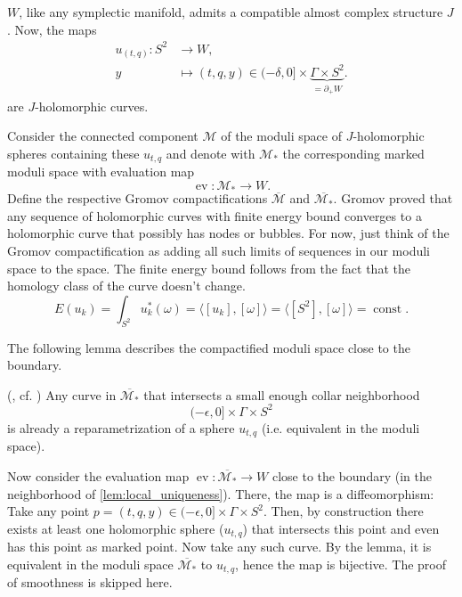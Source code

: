 
$W$, like any symplectic manifold, admits a compatible almost complex structure $J$.
Now, the maps
\begin{align*}
    u_{(t,q)} \colon S^2 &\to W,\\
    y &\mapsto (t, q, y) \in (-\delta, 0] \times \underbrace{\Gamma \times S^2}_{= \partial_+ W}.
\end{align*}
are $J$-holomorphic curves.

Consider the connected component $\mathcal{M}$ of the moduli space of $J$-holomorphic spheres containing these $u_{t,q}$
and denote with $\mathcal{M}_*$ the corresponding marked moduli space with evaluation map
\[
    \operatorname{ev}\colon \mathcal{M}_* \to W.
\]
Define the respective Gromov compactifications $\overline{\mathcal{M}}$ and $\overline{\mathcal{M}_*}$.
Gromov proved that any sequence of holomorphic curves with finite energy bound converges to a
holomorphic curve that possibly has nodes or bubbles.
For now, just think of the Gromov compactification as adding all such limits of sequences in our moduli space to the space.
The finite energy bound follows from the fact that the homology class of the curve doesn't change.
\[
    E(u_k) = \int_{S^2} u_k^*(\omega) = \langle [u_k], [\omega] \rangle = \langle [S^2], [\omega]\rangle = \operatorname{const}.
\]

The following lemma describes the compactified moduli space close to the boundary.
\begin{lemma}(\cite[Lemma 6.3]{BGM22}, cf. \cite[page 334]{MNW13})\label{lem:local_uniqueness}
    Any curve in $\overline{\mathcal M_*}$ that intersects a small enough collar neighborhood
    \[
        (-\epsilon, 0] \times \Gamma \times S^2
    \]
    is already a reparametrization of a sphere $u_{t,q}$ (i.e. equivalent in the moduli space).
\end{lemma}

Now consider the evaluation map $\operatorname{ev}\colon \overline{\mathcal M_*} \to W$ close to the boundary (in the neighborhood of \cref{lem:local_uniqueness}).
There, the map is a diffeomorphism: Take any point $p  = (t, q, y) \in (-\epsilon, 0] \times \Gamma \times S^2$. 
Then, by construction there exists at least one holomorphic sphere ($u_{t,q}$) that intersects this point
and even has this point as marked point.
Now take any such curve. By the lemma, it is equivalent in the moduli space $\overline{\mathcal M_*}$ to $u_{t,q}$, hence the map is bijective.
The proof of smoothness is skipped here.

